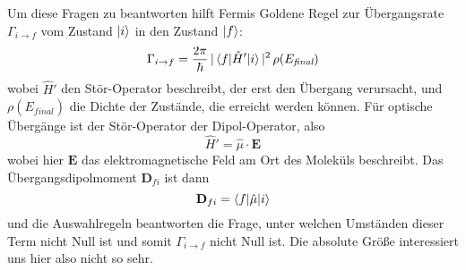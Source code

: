 Um diese Fragen zu beantworten hilft Fermis Goldene Regel zur Übergangsrate $\Gamma_{i \rightarrow f}$ vom Zustand $\ket{i}$ in den Zustand $\ket{f}$:
\begin{equation}
\Gamma_{i \rightarrow f} = \frac{2 \pi}{\hbar} \, |\braket{f | \hat{H}' | i} |^2 \, \rho(E_\textit{final})
\end{equation}
wobei $\hat{H}'$ den Stör-Operator beschreibt, der erst den Übergang verursacht, und $ \rho(E_\textit{final})$ die Dichte der Zustände, die erreicht werden können. Für optische Übergänge ist der Stör-Operator der Dipol-Operator, also
\begin{equation}
\hat{H}' = \hat{\mu} \cdot \mathbf{E}
\end{equation}
wobei hier $\mathbf{E}$ das elektromagnetische Feld am Ort des Moleküls beschreibt. Das Übergangsdipolmoment $\mathbf{D}_{fi}$ ist dann 
\begin{equation}
 \mathbf{D}_{fi} = \braket{f | \hat{\mu} | i} 
\end{equation}
und die Auswahlregeln beantworten die Frage, unter welchen Umständen dieser Term nicht Null ist und somit $\Gamma_{i \rightarrow f} $ nicht Null ist. Die absolute Größe interessiert uns hier also nicht so sehr.

